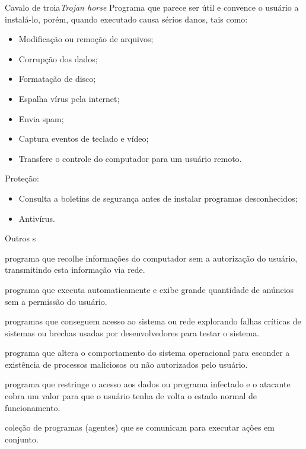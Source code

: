 \begin{frame}{Cavalo de troia}{\it Trojan horse}\footnotesize
  Programa que parece ser útil e convence o usuário a instalá-lo,
  porém, quando executado causa sérios danos, tais como:
  
  \begin{itemize}
    \item Modificação ou remoção de arquivos;
    \item Corrupção dos dados;
    \item Formatação de disco;
    \item Espalha vírus pela internet;
    \item Envia spam;
    \item Captura eventos de teclado e vídeo;
    \item Transfere o controle do computador para um usuário remoto.
    \end{itemize}

    \pause\bigskip
    \alert{Proteção:}
    \begin{itemize}
    \item Consulta a boletins de segurança antes de instalar programas desconhecidos;
    \item Antivírus.
    \end{itemize}
  \end{frame}

\begin{frame}{Outros \insertlecture s}\footnotesize
  \begin{description}[<+->]
  \item[{\em Spyware}:] programa que recolhe informações do computador 
    sem a autorização do usuário, transmitindo esta informação via rede.
  \item[{\em Adware}:] programa que executa automaticamente e exibe 
    grande quantidade de anúncios sem a permissão do usuário.
  \item[{\em Backdoor}:] programas que conseguem acesso ao sistema ou rede 
    explorando falhas críticas de sistemas ou brechas usadas por desenvolvedores 
    para testar o sistema.
  \item[{\em Rootkit}:] programa que altera o comportamento do sistema operacional 
    para esconder a existência de processos maliciosos ou não autorizados pelo 
    usuário.
  \item[{\em Ransomware}:] programa que restringe o acesso aos dados ou programa 
    infectado e o atacante cobra um valor para que o usuário tenha de volta 
    o estado normal de funcionamento.
  \item[{\em Botnet}:] coleção de programas (agentes) que se comunicam para 
    executar ações em conjunto. 
  \end{description}  
\end{frame}
